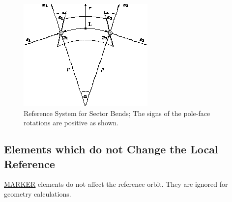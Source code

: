 \begin{figure}[H]
  \centering
	\includegraphics{figures/ref_sbend.png}
  \caption{Reference System for Sector Bends; The signs of the pole-face rotations are positive as shown. }
\end{figure}


\subsection{Elements which do not Change the Local Reference}
\href{marker.html}{MARKER} elements do not  affect the reference orbit. They are ignored for geometry calculations.  




%
%
%
%
%
%
%
%
%
%
